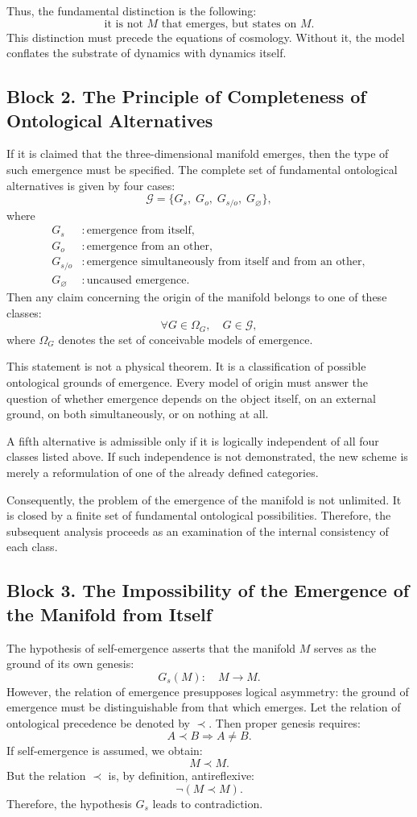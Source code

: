 \documentclass[12pt,a4paper]{article}
\theoremstyle{definition}
\begin{document}
Thus, the fundamental distinction is the following:
\[
\text{it is not } M \text{ that emerges, but states on } M.
\]
This distinction must precede the equations of cosmology. Without it, the model conflates the substrate of dynamics with dynamics itself.



\subsection{Block 2. The Principle of Completeness of Ontological Alternatives}
If it is claimed that the three-dimensional manifold emerges, then the type of such emergence must be specified. The complete set of fundamental ontological alternatives is given by four cases:
\[
\mathcal G=\{G_s,\;G_o,\;G_{s/o},\;G_{\varnothing}\},
\]
where
\[
\begin{aligned}
G_s &: \text{emergence from itself},\\
G_o &: \text{emergence from an other},\\
G_{s/o} &: \text{emergence simultaneously from itself and from an other},\\
G_{\varnothing} &: \text{uncaused emergence}.
\end{aligned}
\]
Then any claim concerning the origin of the manifold belongs to one of these classes:
\[
\forall G\in\Omega_G,\quad G\in\mathcal G,
\]
where \(\Omega_G\) denotes the set of conceivable models of emergence.

This statement is not a physical theorem. It is a classification of possible ontological grounds of emergence. Every model of origin must answer the question of whether emergence depends on the object itself, on an external ground, on both simultaneously, or on nothing at all.

A fifth alternative is admissible only if it is logically independent of all four classes listed above. If such independence is not demonstrated, the new scheme is merely a reformulation of one of the already defined categories.

Consequently, the problem of the emergence of the manifold is not unlimited. It is closed by a finite set of fundamental ontological possibilities. Therefore, the subsequent analysis proceeds as an examination of the internal consistency of each class.

\subsection{Block 3. The Impossibility of the Emergence of the Manifold from Itself}
The hypothesis of self-emergence asserts that the manifold \(M\) serves as the ground of its own genesis:
\[
G_s(M):\quad M\to M.
\]
However, the relation of emergence presupposes logical asymmetry: the ground of emergence must be distinguishable from that which emerges. Let the relation of ontological precedence be denoted by \(\prec\). Then proper genesis requires:
\[
A\prec B\Rightarrow A\neq B.
\]
If self-emergence is assumed, we obtain:
\[
M\prec M.
\]
But the relation \(\prec\) is, by definition, antireflexive:
\[
\neg(M\prec M).
\]
Therefore, the hypothesis \(G_s\) leads to contradiction.
\end{document}
